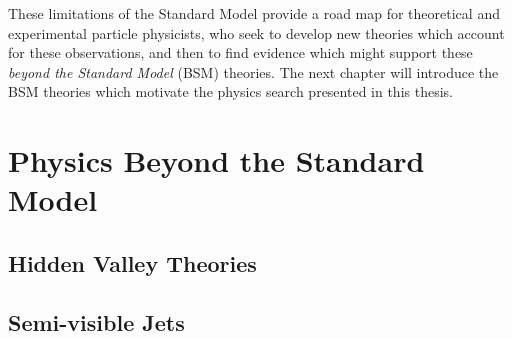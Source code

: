 These limitations of the Standard Model provide a road map for theoretical and experimental particle physicists, who seek to develop new theories which account for these observations, and then to find evidence which might support these \textit{beyond the Standard Model} (BSM) theories. The next chapter will introduce the BSM theories which motivate the physics search presented in this thesis. 
  
\chapter{Physics Beyond the Standard Model}
\section{Hidden Valley Theories}
\section{Semi-visible Jets}